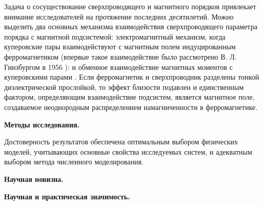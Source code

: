 Задача о сосуществование сверхпроводящего и магнитного порядков привлекает 
внимание исследователей на протяжение последних десятилетий. Можно выделить 
два основных механизма взаимодействия сверхпроводящего параметра порядка с 
магнитной подсистемой: электромагнитный механизм, когда куперовские пары 
взаимодействуют с магнитным полем индуцированным ферромагнетиком (впервые 
такое взаимодействие было рассмотрено В. Л. Гинзбургом в 1956 
\cite{ginzburg}): и обменное взаимодействие магнитных моментов с куперовскими 
парами \cite{buzdin,bulaev}. Если ферромагнетик и сверхпроводник разделены 
тонкой диэлектрической прослойкой, то эффект близости подавлен и единственным 
фактором, определяющим взаимодействие подсистем, является магнитное поле, 
создаваемое неоднородным распределением намагниченности в ферромагнетике.

\textbf{Методы исследования.}

Достоверность результатов обеспечена оптимальным выбором физических моделей, 
учитывающих основные свойства исследуемых систем, и адекватным выбором метода 
численного моделирования.

\textbf{Научная новизна.}

\textbf{Научная и практическая значимость.}

\newpage